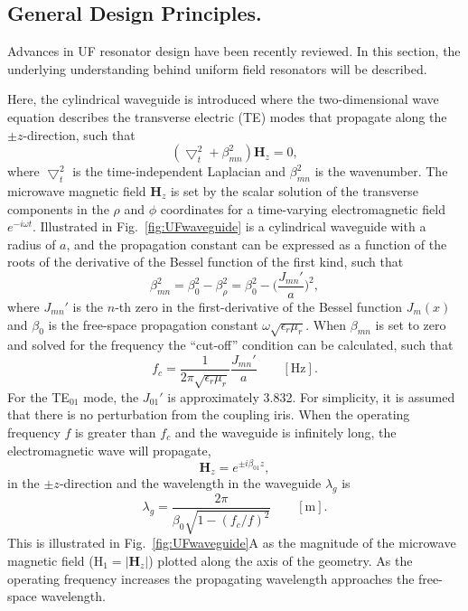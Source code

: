 \subsection*{General Design Principles.}
Advances in UF resonator design have been recently reviewed. \cite{HydeUFRev2019} In this section, the underlying understanding behind uniform field resonators will be described.

Here, the cylindrical waveguide is introduced where the two-dimensional wave equation describes the transverse electric (TE) modes that propagate along the $\pm z$-direction, such that
\begin{equation}
    (\bigtriangledown_t^2 + \beta_{mn}^2) \mathbf{H}_z = 0,
\end{equation}
where $\bigtriangledown_t^2$ is the time-independent Laplacian and $\beta_{mn}^2$ is the wavenumber. The microwave magnetic field $\mathbf{H}_z$ is set by the scalar solution of the transverse components in the $\rho$ and $\phi$ coordinates for a time-varying electromagnetic field $e^{-i \omega t}$. Illustrated in Fig.~\ref{fig:UFwaveguide} is a cylindrical waveguide with a radius of $a$, and the propagation constant can be expressed as a function of the roots of the derivative of the Bessel function of the first kind, such that
\begin{equation}
    \beta_{mn}^2 = \beta_0^2 - \beta_\rho^2 = \beta_0^2 - \bigg(\frac{J_{mn}'}{a}\bigg)^2,
\end{equation}
where $J_{mn}'$ is the $n$-th zero in the first-derivative of the Bessel function $J_m(x)$ and $\beta_0$ is the free-space propagation constant $\omega\sqrt{\epsilon_r \mu_r}$. When $\beta_{mn}$ is set to zero and solved for the frequency the ``cut-off'' condition can be calculated, such that
\begin{equation}
    f_c = \frac{1}{2 \pi \sqrt{\epsilon_r \mu_r}}\frac{J_{mn}'}{a} \qquad [\text{Hz}].
\end{equation}
For the TE$_{01}$ mode, the $J_{01}'$ is approximately 3.832. For simplicity, it is assumed that there is no perturbation from the coupling iris. When the operating frequency $f$ is greater than $f_c$ and the waveguide is infinitely long, the electromagnetic wave will propagate,
\begin{equation}
    \mathbf{H}_z = e^{\pm i\beta_{01}z},\label{propH}
\end{equation}
in the $\pm z$-direction and the wavelength in the waveguide $\lambda_g$ is 
\begin{equation}
    \lambda_g = \frac{2\pi}{\beta_0 \sqrt{1-(f_c/f)^2}} \qquad [\text{m}].\label{wavelength}
\end{equation}
This is illustrated in Fig.~\ref{fig:UFwaveguide}A as the magnitude of the microwave magnetic field (H$_1 = |\mathbf{H}_z|$) plotted along the axis of the geometry. As the operating frequency increases the propagating wavelength approaches the free-space wavelength. \cite{harrington1961time} 

